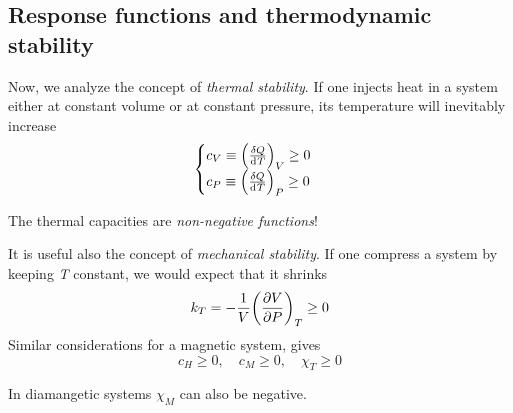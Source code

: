 \documentclass[../../Main/Main.tex]{subfiles}
\begin{document}
\subsection{Response functions and thermodynamic stability}
Now, we analyze the concept of \textit{thermal stability}. If one injects heat in a system either at constant volume or at constant pressure, its temperature will inevitably increase
\begin{equation}
  \begin{cases}
   c_V \equiv \qty(\frac{\delta Q}{\dd[]{T} })_V \ge 0  \\
   c_P \equiv \qty(\frac{\delta Q}{\dd[]{T} })_P \ge 0
  \end{cases}
\label{eq:}
\end{equation}
\begin{remark}
The thermal capacities are \emph{non-negative functions}!
\end{remark}
It is useful also the concept of \textit{mechanical stability}. If one compress a system by keeping \emph{T} constant, we would expect that it shrinks
\begin{equation}
  k_T = - \frac{1}{V} \qty(\pdv{V}{P} )_T \ge 0
  \label{eq:}
\end{equation}
Similar considerations for a magnetic system, gives
\begin{equation}
  c_H \ge 0, \quad c_M \ge 0, \quad \chi_T \ge 0
  \label{eq:}
\end{equation}
\begin{remark}
In diamangetic systems \( \chi_M \) can also be negative.
\end{remark}
\end{document}
